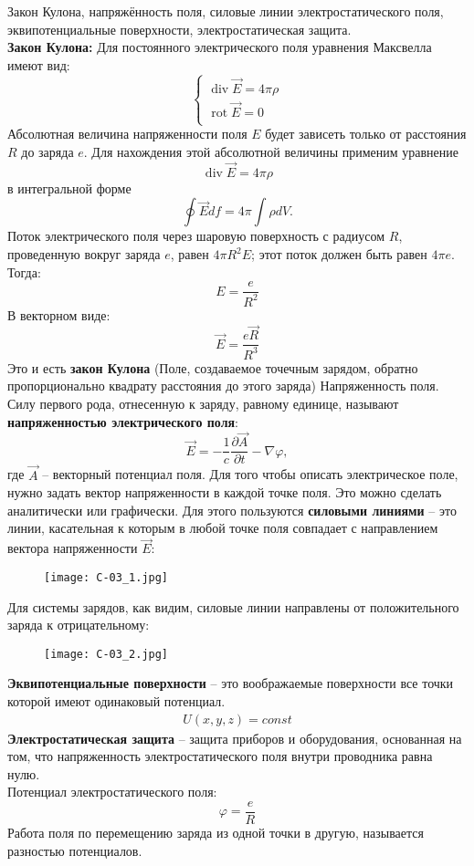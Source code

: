 \documentclass[__main__.tex]{subfiles}
\begin{document}
Закон Кулона, напряжённость поля, силовые линии электростатического поля, эквипотенциальные поверхности, электростатическая защита.\\

\textbf{Закон Кулона:} Для постоянного электрического поля уравнения Максвелла имеют вид:
$$
\begin{cases}
\operatorname{div}\vec{E} = 4 \pi \rho\\
\operatorname{rot}\vec{E} = 0\\
\end{cases}
$$
Абсолютная величина напряженности поля $E$ будет зависеть только от расстояния $R$ до заряда $e$. Для нахождения этой абсолютной величины применим уравнение
$$
    \operatorname{div}\vec{E}=4\pi\rho
$$
в интегральной форме
$$
    \oint\vec{E}df=4\pi\int\rho dV.
$$
Поток электрического поля через шаровую поверхность с радиусом $R$, проведенную вокруг заряда $e$, равен $4\pi R^2 E$; этот поток должен быть равен $4\pi e$. Тогда:
$$
    E=\frac{e}{R^2}
$$
В векторном виде:
$$
    \vec{E}=\frac{e \vec{R}}{R^3}
$$
Это и есть \textbf{закон Кулона} (Поле, создаваемое точечным зарядом, обратно пропорционально квадрату расстояния до этого заряда)
Напряженность поля. Силу первого рода, отнесенную к заряду, равному единице, называют \textbf{напряженностью электрического поля}:\\
$$
    \vec{E} = -\frac{1}{c}\frac{\partial \vec{A}}{\partial t}-\nabla\varphi,
$$
где $\vec{A}$ -- векторный потенциал поля. Для того чтобы описать электрическое поле, нужно задать вектор напряженности в каждой точке поля. Это можно сделать аналитически или графически. Для этого пользуются \textbf{силовыми линиями} -- это линии, касательная к которым в любой точке поля совпадает с направлением вектора напряженности $\vec{E}$:
\begin{figure}[h]
\centering
\texttt{[image: С-03\_1.jpg]}
\end{figure}
Для системы зарядов, как видим, силовые линии направлены от положительного заряда к отрицательному:
\begin{figure}[h]
\centering
\texttt{[image: С-03\_2.jpg]}
\end{figure}
\textbf{Эквипотенциальные поверхности} -- это воображаемые поверхности все точки которой имеют одинаковый потенциал.
\begin{gather*}
    U(x,y,z) = const
\end{gather*}
\textbf{Электростатическая защита} -- защита приборов и оборудования, основанная на том, что напряженность электростатического поля внутри проводника равна нулю.\\
Потенциал электростатического поля:
$$
    \varphi=\frac{e}{R}
$$
Работа поля по перемещению заряда из одной точки в другую, называется разностью потенциалов.\\
\end{document}
